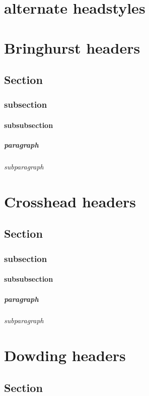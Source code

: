 \documentclass[a4paper, 12pt]{memoir}
\begin{document}
\chapter*{ alternate headstyles }
 
\chapter*{ Bringhurst headers } 
\section*{Section}
\subsection*{subsection }
\subsubsection*{subsubsection} 
\paragraph*{paragraph} 
\subparagraph*{subparagraph} 

\chapter*{ Crosshead headers } 
\section*{ Section }
\subsection*{subsection }
\subsubsection*{subsubsection} 
\paragraph*{paragraph} 
\subparagraph*{subparagraph} 

\chapter*{ Dowding headers } 
\section*{ Section }
\end{document}
